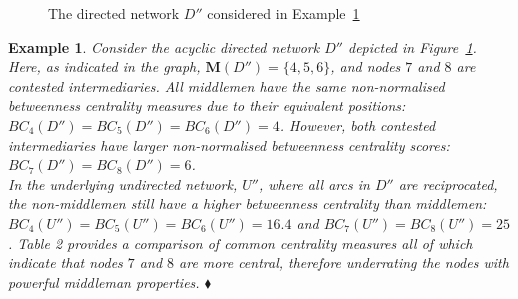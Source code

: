 \documentclass[11pt,fleqn]{article}
\newtheorem{expl}[theorem]{Example}
\newenvironment{example}{\begin{expl} \rm}{\hfill $\blacklozenge$ \end{expl}}{}
\begin{document}
\begin{figure}[h]
\begin{center}
\end{center}
\caption[Differentiating betweenness and middlemen]{The directed network $D''$ considered in Example~\ref{ex:BC}}
\label{mmnmm}
\end{figure}

\begin{example} \label{ex:BC}
Consider the acyclic directed network $D''$ depicted in Figure~\ref{mmnmm}. Here, as indicated in the graph, $\mathbf{M} (D'') = \{ 4, 5, 6 \}$, and nodes $7$ and $8$ are contested intermediaries. All middlemen have the same non-normalised betweenness centrality measures due to their equivalent positions: $BC_{4}(D'') = BC_{5}(D'') = BC_{6}(D'') = 4$. However, both contested intermediaries have larger non-normalised betweenness centrality scores: $BC_{7}(D'')=BC_{8}(D'')=6$.
\\
In the underlying undirected network, $U''$, where all arcs in $D''$ are reciprocated, the non-middlemen still have a higher betweenness centrality than middlemen: $BC_{4}(U'')=BC_{5}(U'')=BC_{6}(U'')=16.4$ and $BC_{7}(U'')=BC_{8}(U'')=25$. Table 2 provides a comparison of common centrality measures all of which indicate that nodes $7$ and $8$ are more central, therefore underrating the nodes with powerful middleman properties.
\end{example}
\end{document}
